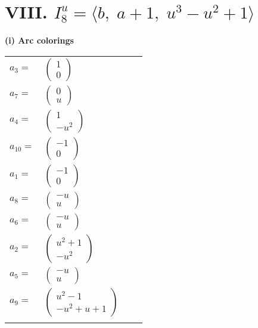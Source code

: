 \documentclass[1p]{elsarticle_modified}
\theoremstyle{definition}
\begin{document}
\centering \section*{VIII. $I^u_{8}= \langle b,\;a+1,\;u^3- u^2+1 \rangle$}
\flushleft \textbf{(i) Arc colorings}\\
\begin{tabular}{m{7pt} m{180pt} m{7pt} m{180pt} }
\flushright $a_{3}=$&$\begin{pmatrix}1\\0\end{pmatrix}$ \\
\flushright $a_{7}=$&$\begin{pmatrix}0\\u\end{pmatrix}$ \\
\flushright $a_{4}=$&$\begin{pmatrix}1\\- u^2\end{pmatrix}$ \\
\flushright $a_{10}=$&$\begin{pmatrix}-1\\0\end{pmatrix}$ \\
\flushright $a_{1}=$&$\begin{pmatrix}-1\\0\end{pmatrix}$ \\
\flushright $a_{8}=$&$\begin{pmatrix}- u\\u\end{pmatrix}$ \\
\flushright $a_{6}=$&$\begin{pmatrix}- u\\u\end{pmatrix}$ \\
\flushright $a_{2}=$&$\begin{pmatrix}u^2+1\\- u^2\end{pmatrix}$ \\
\flushright $a_{5}=$&$\begin{pmatrix}- u\\u\end{pmatrix}$ \\
\flushright $a_{9}=$&$\begin{pmatrix}u^2-1\\- u^2+u+1\end{pmatrix}$\\&\end{tabular}
\end{document}
